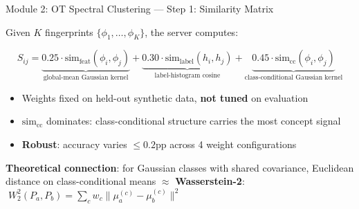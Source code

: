 \documentclass[aspectratio=169,11pt]{beamer}
\begin{document}
\begin{frame}{Module 2: OT Spectral Clustering --- Step 1: Similarity Matrix}

Given $K$ fingerprints $\{\phi_1, \ldots, \phi_K\}$, the server computes:

\begin{equation*}
S_{ij} = \underbrace{0.25 \cdot \mathrm{sim}_{\mathrm{feat}}(\phi_i, \phi_j)}_{\text{global-mean Gaussian kernel}}
       + \underbrace{0.30 \cdot \mathrm{sim}_{\mathrm{label}}(h_i, h_j)}_{\text{label-histogram cosine}}
       + \underbrace{0.45 \cdot \mathrm{sim}_{\mathrm{cc}}(\phi_i, \phi_j)}_{\text{class-conditional Gaussian kernel}}
\end{equation*}

\vspace{4pt}
\begin{itemize}\setlength\itemsep{2pt}
  \item Weights fixed on held-out synthetic data, \textbf{not tuned} on evaluation
  \item $\mathrm{sim}_{\mathrm{cc}}$ dominates: class-conditional structure carries the most concept signal
  \item \textbf{Robust}: accuracy varies $\leq 0.2$pp across 4 weight configurations
\end{itemize}

\vspace{4pt}
\textbf{Theoretical connection}: for Gaussian classes with shared covariance,
Euclidean distance on class-conditional means $\approx$ \textbf{Wasserstein-2}:
$\;W_2^2(P_a, P_b) = \sum_c w_c \|\mu_a^{(c)} - \mu_b^{(c)}\|^2$
\end{frame}
\end{document}
